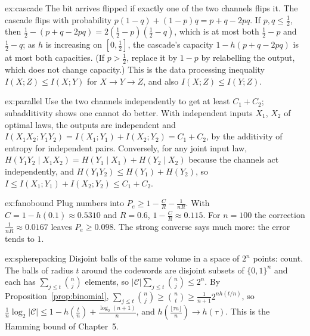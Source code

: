 \begin{solution}{ex:cascade}
\idea The bit arrives flipped if exactly one of the two channels flips it.
\writeup The cascade flips with probability $p(1-q)+(1-p)q=p+q-2pq$. If $p,q\le\frac12$, then $\frac12-(p+q-2pq)=2(\frac12-p)(\frac12-q)$, which is at most both $\frac12-p$ and $\frac12-q$; as $h$ is increasing on $[0,\frac12]$, the cascade's capacity $1-h(p+q-2pq)$ is at most both capacities. (If $p>\frac12$, replace it by $1-p$ by relabelling the output, which does not change capacity.) This is the data processing inequality $I(X;Z)\le I(X;Y)$ for $X\to Y\to Z$, and also $I(X;Z)\le I(Y;Z)$.
\end{solution}

\begin{solution}{ex:parallel}
\idea Use the two channels independently to get at least $C_1+C_2$; subadditivity shows one cannot do better.
\writeup With independent inputs $X_1$, $X_2$ of optimal laws, the outputs are independent and $I(X_1X_2;Y_1Y_2)=I(X_1;Y_1)+I(X_2;Y_2)=C_1+C_2$, by the additivity of entropy for independent pairs. Conversely, for any joint input law, $H(Y_1Y_2\mid X_1X_2)=H(Y_1\mid X_1)+H(Y_2\mid X_2)$ because the channels act independently, and $H(Y_1Y_2)\le H(Y_1)+H(Y_2)$, so $I\le I(X_1;Y_1)+I(X_2;Y_2)\le C_1+C_2$.
\end{solution}

\begin{solution}{ex:fanobound}
\idea Plug numbers into $P_e\ge1-\frac CR-\frac1{nR}$.
\writeup With $C=1-h(0.1)\approx0.5310$ and $R=0.6$, $1-\frac CR\approx0.115$. For $n=100$ the correction $\frac1{nR}\approx0.0167$ leaves $P_e\ge0.098$. The strong converse says much more: the error tends to $1$.
\end{solution}

\begin{solution}{ex:spherepacking}
\idea Disjoint balls of the same volume in a space of $2^n$ points: count.
\writeup The balls of radius $t$ around the codewords are disjoint subsets of $\{0,1\}^n$ and each has $\sum_{j\le t}\binom nj$ elements, so $|\mathcal C|\sum_{j\le t}\binom nj\le2^n$. By Proposition~\ref{prop:binomial}, $\sum_{j\le t}\binom nj\ge\binom nt\ge\frac1{n+1}2^{nh(t/n)}$, so $\frac1n\log_2|\mathcal C|\le1-h(\frac tn)+\frac{\log_2(n+1)}n$, and $h(\frac{\lfloor\tau n\rfloor}n)\to h(\tau)$. This is the Hamming bound of Chapter~5.
\end{solution}


